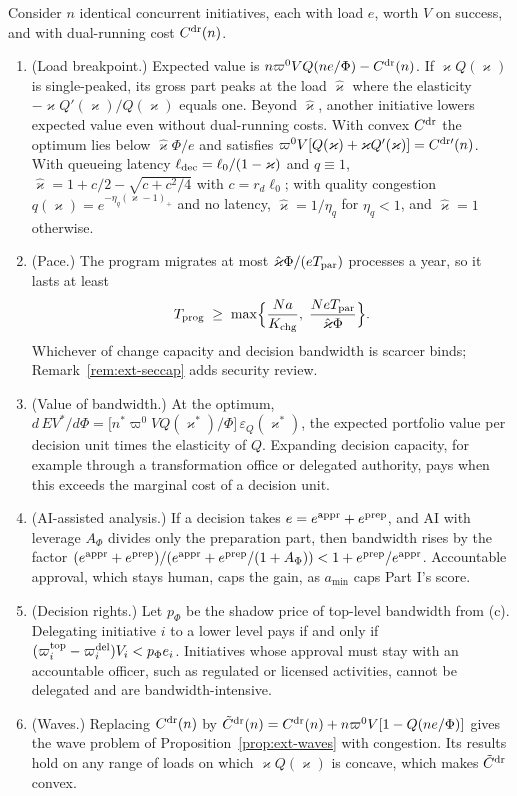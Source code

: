 \begin{proposition}\label{prop:ext-bandwidth}
Consider $n$ identical concurrent initiatives, each with load $e$, worth $V$ on success, and with dual-running cost $C^{\rm dr}(n)$.
\begin{enumerate}
\item[(a)] (Load breakpoint.) Expected value is $n\varpi^0VQ(ne/\Phi)-C^{\rm dr}(n)$. If $\varkappa Q(\varkappa)$ is single-peaked, its gross part peaks at the load $\hat \varkappa$ where the elasticity $-\varkappa Q'(\varkappa)/Q(\varkappa)$ equals one. Beyond $\hat \varkappa$, another initiative lowers expected value even without dual-running costs. With convex $C^{\rm dr}$ the optimum lies below $\hat \varkappa\Phi/e$ and satisfies $\varpi^0V[Q(\varkappa)+\varkappa Q'(\varkappa)]=C^{\rm dr\prime}(n)$. With queueing latency $\ell_{\rm dec}=\ell_0/(1-\varkappa)$ and $q\equiv1$, $\hat \varkappa=1+c/2-\sqrt{c+c^2/4}$ with $c=r_d\ell_0$; with quality congestion $q(\varkappa)=e^{-\eta_q(\varkappa-1)_+}$ and no latency, $\hat \varkappa=1/\eta_q$ for $\eta_q<1$, and $\hat \varkappa=1$ otherwise.
\item[(b)] (Pace.) The program migrates at most $\hat \varkappa\Phi/(eT_{\rm par})$ processes a year, so it lasts at least
\[
T_{\rm prog}\;\ge\;\max\Bigl\{\frac{Na}{K_{\rm chg}},\;\frac{NeT_{\rm par}}{\hat \varkappa\Phi}\Bigr\}.
\]
Whichever of change capacity and decision bandwidth is scarcer binds; Remark~\ref{rem:ext-seccap} adds security review.
\item[(c)] (Value of bandwidth.) At the optimum, $d\,EV^*/d\Phi=\bigl[n^*\varpi^0VQ(\varkappa^*)/\Phi\bigr]\,\varepsilon_Q(\varkappa^*)$, the expected portfolio value per decision unit times the elasticity of $Q$. Expanding decision capacity, for example through a transformation office or delegated authority, pays when this exceeds the marginal cost of a decision unit.
\item[(d)] (AI-assisted analysis.) If a decision takes $e=e^{\rm appr}+e^{\rm prep}$, and AI with leverage $A_\Phi$ divides only the preparation part, then bandwidth rises by the factor $(e^{\rm appr}+e^{\rm prep})/(e^{\rm appr}+e^{\rm prep}/(1+A_\Phi))<1+e^{\rm prep}/e^{\rm appr}$. Accountable approval, which stays human, caps the gain, as $a_{\min}$ caps Part I's score.
\item[(e)] (Decision rights.) Let $p_\Phi$ be the shadow price of top-level bandwidth from (c). Delegating initiative $i$ to a lower level pays if and only if $(\varpi^{\rm top}_i-\varpi^{\rm del}_i)V_i<p_\Phi e_i$. Initiatives whose approval must stay with an accountable officer, such as regulated or licensed activities, cannot be delegated and are bandwidth-intensive.
\item[(f)] (Waves.) Replacing $C^{\rm dr}(n)$ by $\tilde C^{\rm dr}(n)=C^{\rm dr}(n)+n\varpi^0V[1-Q(ne/\Phi)]$ gives the wave problem of Proposition~\ref{prop:ext-waves} with congestion. Its results hold on any range of loads on which $\varkappa Q(\varkappa)$ is concave, which makes $\tilde C^{\rm dr}$ convex.
\end{enumerate}
\end{proposition}

